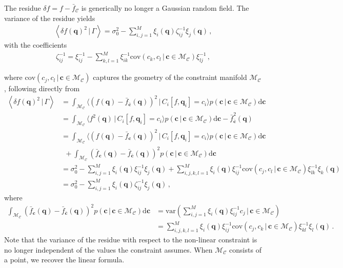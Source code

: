 \documentclass[a4paper, 11pt]{article}
\begin{document}
\begin{itemize}
\begin{framed}
\item
The residue $\delta f = f - \bar{f}_{\mathcal{C}}$ is generically no longer a Gaussian random field. The variance of the residue yields
\begin{align}
\left \langle \delta f (\bm{q})^2\,|\,\Gamma\right\rangle =
\sigma_0^2 - \sum_{i,j=1}^M\xi_i(\bm{q}) \zeta_{ij}^{-1} \xi_j(\bm{q}) 
\,,\label{eq:variance_Nonlinear}
\end{align}
with the coefficients
\begin{align}
\zeta_{ij}^{-1}= \xi_{ij}^{-1}-\sum_{k,l=1}^M\xi_{ik}^{-1}\text{cov}(c_k, c_l\,|\,\bm{c}\in\mathcal{M}_\mathcal{C})\xi_{lj}^{-1}\,,
\end{align}
\end{framed}
where $\text{cov}(c_j, c_l\,|\,\bm{c}\in\mathcal{M}_\mathcal{C})$ captures the geometry of the constraint manifold $\mathcal{M}_\mathcal{C}$, following directly from
\begin{align}
\left \langle \delta f (\bm{q})^2\,|\,\Gamma\right\rangle 
&= \int_{\mathcal{M}_\mathcal{C}} \langle (f(\bm{q})-\bar{f}_{\bar{\bm{c}}}(\bm{q}))^2\,|\,C_i[f,\bm{q}_i]=c_i\rangle p(\bm{c}\,|\,\bm{c}\in\mathcal{M}_{\mathcal{C}})\mathrm{d}\bm{c}\nonumber \\
&= \int_{\mathcal{M}_\mathcal{C}} \langle f^2(\bm{q})\,|\,C_i[f,\bm{q}_i]=c_i\rangle p(\bm{c}\,|\,\bm{c}\in\mathcal{M}_{\mathcal{C}})\mathrm{d}\bm{c} - \bar{f}_{\bar{\bm{c}}}^2(\bm{q})\nonumber \\
&= \int_{\mathcal{M}_\mathcal{C}} \langle (f(\bm{q})-\bar{f}_{\bm{c}}(\bm{q}))^2\,|\,C_i[f,\bm{q}_i]=c_i\rangle p(\bm{c}\,|\,\bm{c}\in\mathcal{M}_{\mathcal{C}})\mathrm{d}\bm{c} \nonumber \\
&\ \ +\int_{\mathcal{M}_\mathcal{C}} (\bar{f}_{\bm{c}}(\bm{q})- \bar{f}_{\bar{\bm{c}}}(\bm{q}))^2p(\bm{c}\,|\,\bm{c}\in\mathcal{M}_{\mathcal{C}})\mathrm{d}\bm{c} \nonumber \\
&=  \sigma_0^2 - \sum_{i,j=1}^M\xi_i(\bm{q}) \xi_{ij}^{-1} \xi_j(\bm{q}) + \sum_{i,j,k,l=1}^M \xi_{i}(\bm{q})\xi_{ij}^{-1}\text{cov}(c_j, c_l\,|\,\bm{c}\in\mathcal{M}_\mathcal{C})\xi_{lk}^{-1}\xi_{k}(\bm{q})\nonumber\\
&=
\sigma_0^2 - \sum_{i,j=1}^M\xi_i(\bm{q}) \zeta_{ij}^{-1} \xi_j(\bm{q})\,,
\end{align}
where
\begin{align}
\int_{\mathcal{M}_\mathcal{C}} (\bar{f}_{\bm{c}}(\bm{q})- \bar{f}_{\bar{\bm{c}}}(\bm{q}))^2p(\bm{c}\,|\,\bm{c}\in\mathcal{M}_{\mathcal{C}})\mathrm{d}\bm{c} 
&= \text{var}\left(\sum_{i,j=1}^M\xi_i(\bm{q})\xi_{ij}^{-1}c_j\,|\,\bm{c}\in \mathcal{M}_\mathcal{C}\right)\\
&=\sum_{i,j,k,l=1}^M \xi_i(\bm{q})\xi_{ij}^{-1}\text{cov}(c_j,c_k\,|\,\bm{c}\in\mathcal{M}_\mathcal{C})\xi_{kl}^{-1}\xi_l(\bm{q})\,.\nonumber
\end{align}
Note that the variance of the residue with respect to the non-linear constraint is no longer independent of the values the constraint assumes. When $\mathcal{M}_\mathcal{C}$ consists of a point, we recover the linear formula.
\end{itemize}
\end{document}
